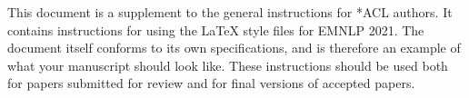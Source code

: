 
This document is a supplement to the general instructions for *ACL authors. It contains instructions for using the \LaTeX{} style files for EMNLP 2021. 
The document itself conforms to its own specifications, and is therefore an example of what your manuscript should look like.
These instructions should be used both for papers submitted for review and for final versions of accepted papers.